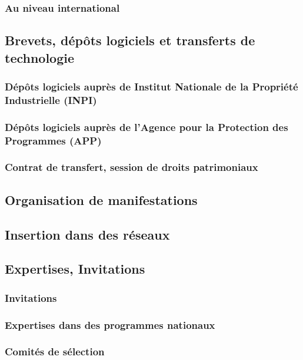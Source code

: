 \documentclass[french]{hdrapplication}
\begin{document}
\subsubsection{Au niveau international}

\subsection{Brevets, dépôts logiciels et transferts de technologie}

\subsubsection{Dépôts logiciels auprès de Institut Nationale de la Propriété Industrielle (INPI)}

\subsubsection{Dépôts logiciels auprès de l'Agence pour la Protection des Programmes (APP)}

\subsubsection{Contrat de transfert, session de droits patrimoniaux}

\subsection{Organisation de manifestations}

\subsection{Insertion dans des réseaux}

\subsection{Expertises, Invitations}

\subsubsection{Invitations}

\subsubsection{Expertises dans des programmes nationaux}

\subsubsection{Comités de sélection}
\end{document}
